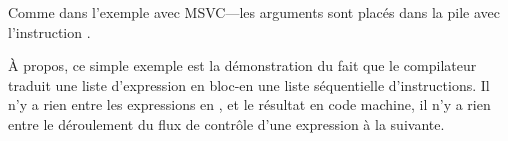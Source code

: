 Comme dans l'exemple avec MSVC---les arguments sont placés dans la pile avec l'instruction
\MOV.


À propos, ce simple exemple est la démonstration du fait que le compilateur traduit
une liste d'expression en bloc-\CCpp en une liste séquentielle d'instructions.
Il n'y a rien entre les expressions en \CCpp, et le résultat en code machine,
il n'y a rien entre le déroulement du flux de contrôle d'une expression à la suivante.
